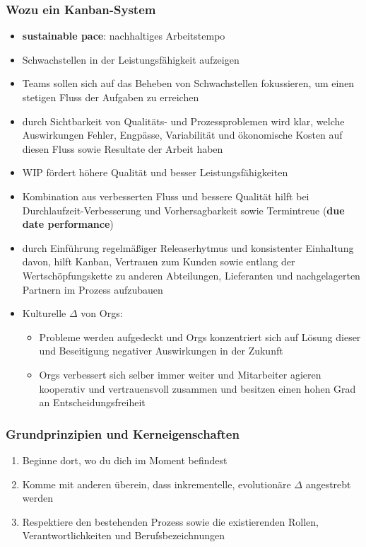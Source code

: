 \subsubsection{Wozu ein Kanban-System}
\begin{itemize}
  \item \textbf{sustainable pace}: nachhaltiges Arbeitstempo
  \item Schwachstellen in der Leistungsfähigkeit aufzeigen
  \item Teams sollen sich auf das Beheben von Schwachstellen fokussieren, um einen stetigen Fluss
    der Aufgaben zu erreichen
  \item durch Sichtbarkeit von Qualitäts- und Prozessproblemen wird klar, welche Auswirkungen
    Fehler, Engpässe, Variabilität und ökonomische Kosten auf diesen Fluss sowie Resultate der
    Arbeit haben
  \item WIP fördert höhere Qualität und besser Leistungsfähigkeiten
  \item Kombination aus verbesserten Fluss und bessere Qualität hilft bei Durchlaufzeit-Verbesserung
    und Vorhersagbarkeit sowie Termintreue (\textbf{due date performance})
  \item durch Einführung regelmäßiger Releaserhytmus und konsistenter Einhaltung davon, hilft
    Kanban, Vertrauen zum Kunden sowie entlang der Wertschöpfungskette zu anderen Abteilungen,
    Lieferanten und nachgelagerten Partnern im Prozess aufzubauen
  \item Kulturelle $\Delta$ von Orgs:
    \begin{itemize}
      \item Probleme werden aufgedeckt und Orgs konzentriert sich auf Lösung dieser und Beseitigung
        negativer Auswirkungen in der Zukunft
      \item Orgs verbessert sich selber immer weiter und Mitarbeiter agieren kooperativ und
        vertrauensvoll zusammen und besitzen einen hohen Grad an Entscheidungsfreiheit
    \end{itemize}
\end{itemize}


\subsubsection{Grundprinzipien und Kerneigenschaften}

\begin{enumerate}
  \item Beginne dort, wo du dich im Moment befindest
  \item Komme mit anderen überein, dass inkrementelle, evolutionäre $\Delta$ angestrebt werden
  \item Respektiere den bestehenden Prozess sowie die existierenden Rollen, Verantwortlichkeiten und
    Berufsbezeichnungen
\end{enumerate}


